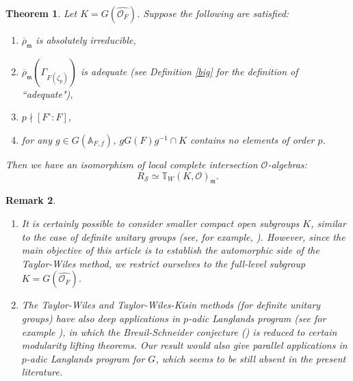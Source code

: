 \documentclass[12pt,oneside,reqno]{amsart}
\newcommand{\A}{\mathbb{A}}
\theoremstyle{plain}
\newtheorem{theorem}{Theorem}[section]
\newtheorem{remark}[theorem]{Remark}
\begin{document}
	\begin{theorem}\label{Theorem-1 R=T}
		Let $K = G(\widehat{\mathcal{O}_F})$. Suppose the following are satisfied:
		\begin{enumerate}
			\item 
			$\overline{\rho}_{\mathfrak{m}}$ is absolutely irreducible,
			
			
			
			\item 
			$\overline{\rho}_{\mathfrak{m}}(\Gamma_{F(\zeta_p)})$ is adequate (see Definition \ref{big} for the definition of ``adequate"),
			
			
			\item 
			$p \nmid [F^\circ : F]$,
			
			
			\item 
			for any $g\in G(\A_{F,f})$, $gG(F)g^{-1}\cap K$ contains no elements of order $p$.
		\end{enumerate}
		Then we have an isomorphism of \emph{local complete intersection} $\mathcal{O}$-algebras:  
		\[
		R_\mathcal{S}
		\simeq
		\mathbb{T}_W(K, \mathcal{O})_\mathfrak{m}.
		\]
	\end{theorem}
	
	
	
	
	
	
	\begin{remark}\rm
		\begin{enumerate}
			\item 
			It is certainly possible to consider smaller compact open subgroups $K$, similar to the case of definite unitary groups (see, for example, \cite{ClozelHarrisTaylor2008,Thorne2012}). However, since the main objective of this article is to establish the automorphic side of the Taylor-Wiles method, we restrict ourselves to the full-level subgroup $K=G(\widehat{\mathcal{O}_F})$.
			
			
			
			
			\item 
			The Taylor-Wiles and Taylor-Wiles-Kisin methods (for definite unitary groups) have also deep applications in $p$-adic Langlands program (see for example \cite{CaraianiEmertonGeraghtyPaskunasShin2016}), in which the Breuil-Schneider conjecture (\cite{BreuilSchneider2007}) is reduced to certain modularity lifting theorems. Our result would also give parallel applications in $p$-adic Langlands program for $G$, which seems to be still absent in the present literature.
		\end{enumerate}
	\end{remark}
	
\end{document}
